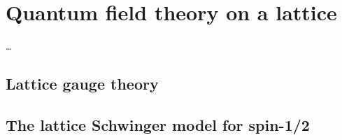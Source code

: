 \documentclass[../main.tex]{subfiles} %
\begin{document}
\chapter{Quantum field theory on a lattice}

\ldots



\section{Lattice gauge theory}

\lipsum



\section{The lattice Schwinger model for spin-1/2}

\lipsum
\end{document}
